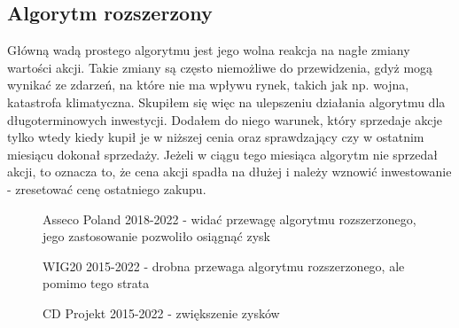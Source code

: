 \documentclass{article}
\begin{document}
    \subsection{Algorytm rozszerzony}
    Główną wadą prostego algorytmu jest jego wolna reakcja na nagłe zmiany wartości akcji. Takie zmiany są często niemożliwe do przewidzenia, gdyż mogą wynikać 
    ze zdarzeń, na które nie ma wpływu rynek, takich jak np. wojna, katastrofa klimatyczna. Skupiłem się więc na ulepszeniu działania algorytmu dla długoterminowych inwestycji.
    Dodałem do niego warunek, który sprzedaje akcje tylko wtedy kiedy kupił je w niższej cenia oraz sprawdzający czy w ostatnim miesiącu dokonał sprzedaży.
    Jeżeli w ciągu tego miesiąca algorytm nie sprzedał akcji, to oznacza to, że cena akcji spadła na dłużej i należy wznowić inwestowanie - zresetować cenę ostatniego zakupu.
    \begin{figure}[H]
        \noindent{}
        \caption{Asseco Poland 2018-2022 - widać przewagę algorytmu rozszerzonego,
        jego zastosowanie pozwoliło osiągnąć zysk}
    \end{figure}
    \begin{figure}[H]
        \noindent{}
        \caption{WIG20 2015-2022 - drobna przewaga algorytmu rozszerzonego, ale pomimo tego strata}
    \end{figure}
    \begin{figure}[H]
        \noindent{}
        \caption{CD Projekt 2015-2022 - zwiększenie zysków}
    \end{figure}
\end{document}
